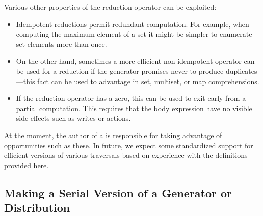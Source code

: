 Various other properties of the reduction operator can be exploited:
\begin{itemize}
\item Idempotent reductions permit redundant computation.  For
  example, when computing the maximum element of a set it might be
  simpler to enumerate set elements more than once.

\item On the other hand, sometimes a more efficient non-idempotent
  operator can be used for a reduction if the generator promises never
  to produce duplicates---this fact can be used to advantage in set,
  multiset, or map comprehensions.

\item If the reduction operator has a zero, this can be used to exit
  early from a partial computation.  This requires that the body
  expression have no visible side effects such as writes or  actions.
\end{itemize}

At the moment, the author of a  is responsible for
taking advantage of opportunities such as these.  In future, we expect
some standardized support for efficient versions of various traversals
based on experience with the definitions provided here.

\subsection{Making a Serial Version of a Generator or Distribution}


